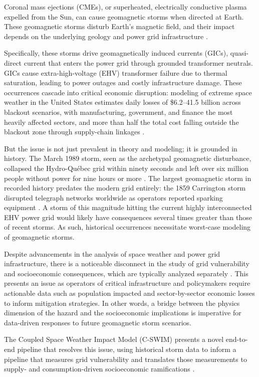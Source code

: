 \documentclass[draft]{agujournal2019}
\begin{document}
Coronal mass ejections (CMEs), or superheated, electrically conductive plasma expelled from the Sun, can cause geomagnetic storms when directed at Earth. These geomagnetic storms disturb Earth's magnetic field, and their impact depends on the underlying geology and power grid infrastructure \cite{Love2024}.

Specifically, these storms drive geomagnetically induced currents (GICs), quasi-direct current that enters the power grid through grounded transformer neutrals. GICs cause extra-high-voltage (EHV) transformer failure due to thermal saturation, leading to power outages and costly infrastructure damage. These occurrences cascade into critical economic disruption: modeling of extreme space weather in the United States estimates daily losses of \$6.2–41.5 billion across blackout scenarios, with manufacturing, government, and finance the most heavily affected sectors, and more than half the total cost falling outside the blackout zone through supply-chain linkages \cite{Oughton2017}.

But the issue is not just prevalent in theory and modeling; it is grounded in history. The March 1989 storm, seen as the archetypal geomagnetic disturbance, collapsed the Hydro-Québec grid within ninety seconds and left over six million people without power for nine hours or more \cite{Boteler2019}. The largest geomagnetic storm in recorded history predates the modern grid entirely: the 1859 Carrington storm disrupted telegraph networks worldwide as operators reported sparking equipment \cite{Boteler2006}. A storm of this magnitude hitting the current highly interconnected EHV power grid would likely have consequences several times greater than those of recent storms. As such, historical occurrences necessitate worst-case modeling of geomagnetic storms. 

Despite advancements in the analysis of space weather and power grid infrastructure, there is a noticeable disconnect in the study of grid vulnerability and socioeconomic consequences, which are typically analyzed separately \cite{Oughton2019}. This presents an issue as operators of critical infrastructure and policymakers require actionable data such as population impacted and sector-by-sector economic losses to inform mitigation strategies. In other words, a bridge between the physics dimension of the hazard and the socioeconomic implications is imperative for data-driven responses to future geomagnetic storm scenarios. 

The Coupled Space Weather Impact Model (C-SWIM) presents a novel end-to-end pipeline that resolves this issue, using historical storm data to inform a pipeline that measures grid vulnerability and translates those measurements to supply- and consumption-driven socioeconomic ramifications \cite{oughton2026majorspaceweatherrisks}.
\end{document}
